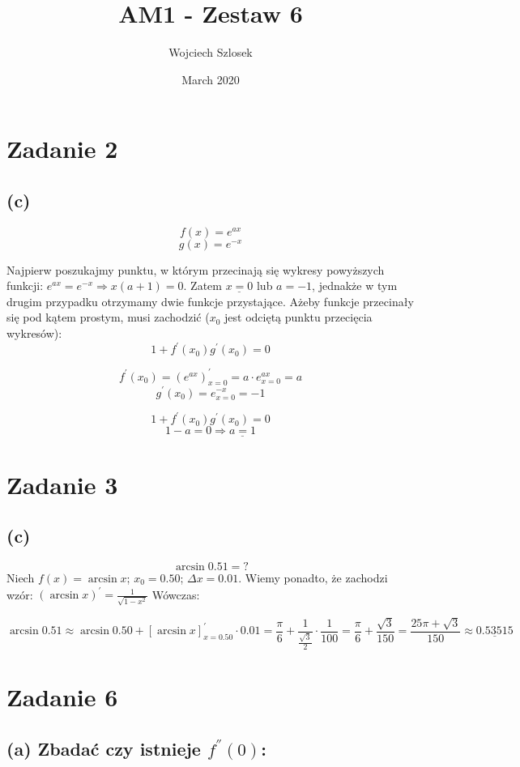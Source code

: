 \documentclass{article}
\title{AM1 - Zestaw 6}
\author{Wojciech Szlosek}
\date{March 2020}
\begin{document}
\maketitle

\section{Zadanie 2}
\subsection{(c)}

$$f(x) = e^{ax}$$
$$g(x) = e^{-x}$$

Najpierw poszukajmy punktu, w którym przecinają się wykresy powyższych funkcji: $e^{ax} = e^{-x} \Rightarrow x(a+1) = 0$. Zatem $\underline{x = 0}$ lub $a = -1$, jednakże w tym drugim przypadku otrzymamy dwie funkcje przystające. Ażeby funkcje przecinały się pod kątem prostym, musi zachodzić ($x_{0}$ jest odciętą punktu przecięcia wykresów):
$$1+f^{'}(x_{0})g^{'}(x_{0}) = 0$$

$$f^{'}(x_{0}) = (e^{ax})^{'}_{x=0} = a \cdot e^{ax}_{x=0} = a$$
$$g^{'}(x_{0}) = e^{-x}_{x=0} = -1$$

$$1+f^{'}(x_{0})g^{'}(x_{0}) = 0$$
$$1 - a = 0 \Rightarrow \underline{a = 1}$$

\section{Zadanie 3}
\subsection{(c)}

$$\arcsin{0.51} = ?$$
Niech $f(x) = \arcsin{x}$; $x_{0} = 0.50$; $\Delta x = 0.01$. \newline Wiemy ponadto, że zachodzi wzór: $(\arcsin{x})^{'} = \frac{1}{\sqrt{1-x^{2}}}$ Wówczas:

$$\arcsin{0.51} \approx \arcsin{0.50} + [\arcsin{x}]^{'}_{x=0.50} \cdot 0.01 = \frac{\pi}{6} + \frac{1}{\frac{\sqrt{3}}{2}} \cdot \frac{1}{100} = \frac{\pi}{6} + \frac{\sqrt{3}}{150} = \frac{25\pi + \sqrt{3}}{150} \approx \underline{0.53515}$$


\section{Zadanie 6}
\subsection{(a) Zbadać czy istnieje $f^{''}(0)$:}
\end{document}
